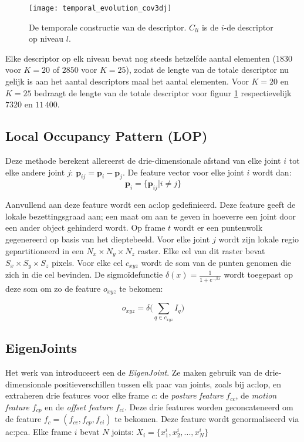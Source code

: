 \begin{figure}
	\centering
	\texttt{[image: temporal\_evolution\_cov3dj]}
	\caption{De temporale constructie van de descriptor. $C_{li}$ is de $i$-de descriptor op niveau $l$. }
	\label{fig:temporal_evolution_cov3dj}
\end{figure}

Elke descriptor op elk niveau bevat nog steeds hetzelfde aantal elementen ($1830$ voor $K = 20$ of $2850$ voor $K = 25$), zodat de lengte van de totale descriptor nu gelijk is aan het aantal descriptors maal het aantal elementen. Voor $K = 20$ en $K = 25$ bedraagt de lengte van de totale descriptor voor figuur \ref{fig:temporal_evolution_cov3dj} respectievelijk $7320$ en $11\,400$.

\subsection{Local Occupancy Pattern (LOP)}
Deze methode \cite{Wang2012b} berekent allereerst de drie-dimensionale afstand van elke joint $i$ tot elke andere joint $j$: $\textbf{p}_{ij} = \textbf{p}_i - \textbf{p}_j$. De feature vector voor elke joint $i$ wordt dan:
$$\textbf{p}_i = \{\textbf{p}_{ij} | i \neq j \}$$

Aanvullend aan deze feature wordt een \gls{ac:lop} gedefinieerd. Deze feature geeft de lokale bezettingsgraad aan; een maat om aan te geven in hoeverre een joint door een ander object gehinderd wordt. Op frame $t$ wordt er een puntenwolk gegenereerd op basis van het dieptebeeld. Voor elke joint $j$ wordt zijn lokale regio gepartitioneerd in een $N_x \times N_y \times N_z$ raster. Elke cel van dit raster bevat $S_x \times S_y \times S_z$ pixels. Voor elke cel $c_{xyz}$ wordt de som van de punten genomen die zich in die cel bevinden. De sigmoïdefunctie $\delta(x) = \frac{1}{1 + e^{-\beta x}}$ wordt toegepast op deze som om zo de feature $o_{xyz}$ te bekomen:

$$o_{xyz} = \delta\bigg(\sum_{q \in c_{xyz}} I_q \bigg)$$
\subsection{EigenJoints}
Het werk van \cite{Yang2012} introduceert een de \textit{EigenJoint}. Ze maken gebruik van de drie-dimensionale positieverschillen tussen elk paar van joints, zoals bij \gls{ac:lop}, en extraheren drie features voor elke frame $c$: de \textit{posture feature} $f_{cc}$, de \textit{motion feature} $f_{cp}$ en de \textit{offset feature} $f_{ci}$. Deze drie features worden geconcateneerd om de feature $f_c = (f_{cc}, f_{cp}, f_{ci})$ te bekomen. Deze feature wordt genormaliseerd via \gls{ac:pca}. Elke frame $i$ bevat $N$ joints: $X_i = \{x_1^i, x_2^i, ..., x_N^i \}$


